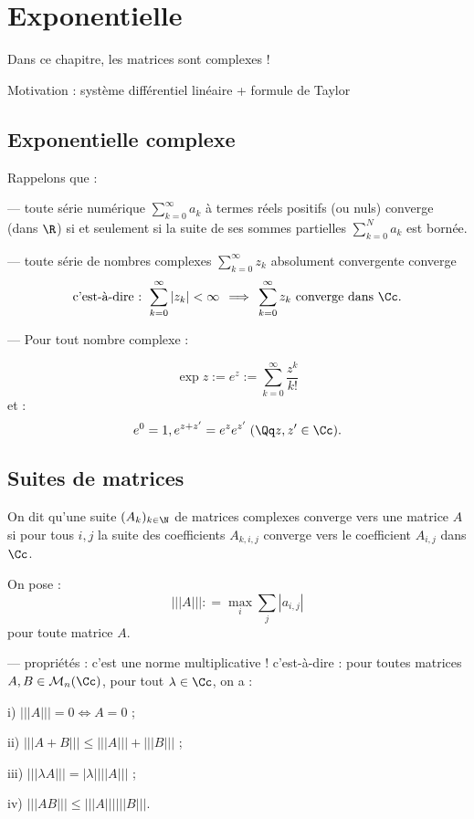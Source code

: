\documentclass[class=report,crop=false]{standalone}
\begin{document}
\chapter{Exponentielle}
Dans ce chapitre, les matrices sont complexes !

Motivation : système différentiel linéaire + formule de Taylor


\section{Exponentielle complexe}

Rappelons que :

--- toute série numérique $\sum_{k=0}^\infty a_k$ à termes réels positifs (ou nuls) converge (dans $\R$) si et seulement si la suite de ses sommes partielles $\sum_{k=0}^Na_k$  est bornée.

--- toute série de nombres complexes $\sum_{k=0}^\infty z_k$ absolument convergente converge
\[\mbox{c'est-à-dire : } \sum_{k=0}^\infty |z_k| < \infty \, \implies \, \sum_{k=0}^\infty z_k \mbox{ converge dans $\Cc$.}\]

--- Pour tout nombre complexe :

\[ \exp z := e^z := \sum_{k=0}^\infty \frac{{z^k}}{k!}\]
et : \[e^0 =1, e^{z+z'} = e^z e^{z'} \; (\Qq z,z' \in \Cc) .\]


\section{Suites de matrices}

\begin{definition}
On dit qu'une suite $(A_k)_{k \in \N}$ de matrices complexes converge vers une matrice $A$ si pour tous $i,j$ la suite des coefficients $A_{k,i,j}$ converge vers le coefficient $A_{i,j}$ dans $\Cc$.
\end{definition}
On pose :
\[
||| A ||| : = \max_i\sum_j|a_{i,j}|\]
pour toute matrice $A$.


--- propriétés : c'est une norme multiplicative ! c'est-à-dire : pour toutes matrices $A,B \in \mathcal{M}_n(\Cc)$, pour tout $\lambda \in \Cc$, on a :

i) $|||A||| = 0 \iff A =0$ ;

ii) $|||A+B||| \le |||A ||| + |||B|||$ ;

iii) $ |||\lambda A||| = |\lambda| |||A|||$ ;

iv) $|||AB||| \le |||A||| |||B|||$.
\end{document}
